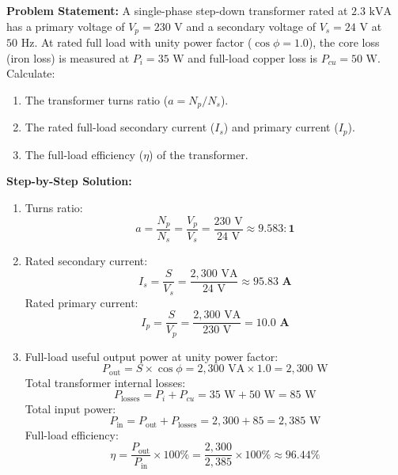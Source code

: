 \begin{tcolorbox}[colback=white,colframe=navyblue,title=\textbf{Problem 6: Step-Down Transformer Turns Ratio, Current, and Efficiency}]
\textbf{Problem Statement:} A single-phase step-down transformer rated at $2.3\text{ kVA}$ has a primary voltage of $V_p = 230\text{ V}$ and a secondary voltage of $V_s = 24\text{ V}$ at $50\text{ Hz}$. At rated full load with unity power factor ($\cos\phi = 1.0$), the core loss (iron loss) is measured at $P_i = 35\text{ W}$ and full-load copper loss is $P_{cu} = 50\text{ W}$. Calculate:
\begin{enumerate}[label=(\alph*),leftmargin=*]
    \item The transformer turns ratio ($a = N_p / N_s$).
    \item The rated full-load secondary current ($I_s$) and primary current ($I_p$).
    \item The full-load efficiency ($\eta$) of the transformer.
\end{enumerate}
\textbf{Step-by-Step Solution:}
\begin{enumerate}[label=(\alph*),leftmargin=*]
    \item Turns ratio:
    \[
    a = \frac{N_p}{N_s} = \frac{V_p}{V_s} = \frac{230\text{ V}}{24\text{ V}} \approx \mathbf{9.583 : 1}
    \]
    \item Rated secondary current:
    \[
    I_s = \frac{S}{V_s} = \frac{2,300\text{ VA}}{24\text{ V}} \approx \mathbf{95.83\text{ A}}
    \]
    Rated primary current:
    \[
    I_p = \frac{S}{V_p} = \frac{2,300\text{ VA}}{230\text{ V}} = \mathbf{10.0\text{ A}}
    \]
    \item Full-load useful output power at unity power factor:
    \[
    P_{\text{out}} = S \times \cos\phi = 2,300\text{ VA} \times 1.0 = 2,300\text{ W}
    \]
    Total transformer internal losses:
    \[
    P_{\text{losses}} = P_i + P_{cu} = 35\text{ W} + 50\text{ W} = 85\text{ W}
    \]
    Total input power:
    \[
    P_{\text{in}} = P_{\text{out}} + P_{\text{losses}} = 2,300 + 85 = 2,385\text{ W}
    \]
    Full-load efficiency:
    \[
    \eta = \frac{P_{\text{out}}}{P_{\text{in}}} \times 100\% = \frac{2,300}{2,385} \times 100\% \approx \mathbf{96.44\%}
    \]
\end{enumerate}
\end{tcolorbox}

